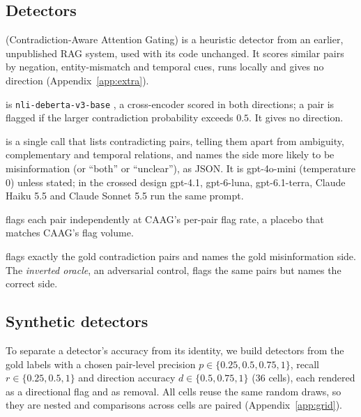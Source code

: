 \subsection{Detectors}
\label{sec:detectors}
\begin{description}[leftmargin=0pt,itemsep=1pt,topsep=2pt]
\item[CAAG] (Contradiction-Aware Attention Gating) is a heuristic detector from an earlier, unpublished RAG system,
used with its code unchanged. It scores similar pairs by negation, entity-mismatch and temporal cues, runs locally
and gives no direction (Appendix~\ref{app:extra}).
\item[NLI] is \texttt{nli-deberta-v3-base} \citep{he2023debertav3}, a cross-encoder scored in both directions; a pair is
flagged if the larger contradiction probability exceeds $0.5$. It gives no direction.
\item[LLM] is a single call that lists contradicting pairs, telling them apart from ambiguity, complementary and
temporal relations, and names the side more likely to be misinformation (or ``both'' or ``unclear''), as JSON. It is
gpt-4o-mini (temperature 0) unless stated; in the crossed design gpt-4.1, gpt-6-luna, gpt-6.1-terra, Claude Haiku 5.5
and Claude Sonnet 5.5 run the same prompt.
\item[Random] flags each pair independently at CAAG's per-pair flag rate, a placebo that matches CAAG's flag volume.
\item[Oracle] flags exactly the gold contradiction pairs and names the gold misinformation side. The
\emph{inverted oracle}, an adversarial control, flags the same pairs but names the correct side.
\end{description}

\subsection{Synthetic detectors}
\label{sec:synthetic}
To separate a detector's accuracy from its identity, we build detectors from the gold labels with a chosen pair-level
precision $p\in\{0.25,0.5,0.75,1\}$, recall $r\in\{0.25,0.5,1\}$ and direction accuracy $d\in\{0.5,0.75,1\}$ (36
cells), each rendered as a directional flag and as removal. All cells reuse the same random draws, so they are nested
and comparisons across cells are paired (Appendix~\ref{app:grid}).
